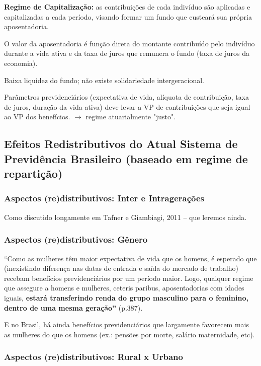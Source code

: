 \documentclass[a4paper,12pt]{article}[abntex2]
\begin{document}
\textbf{Regime de Capitalização:} as contribuições de cada indivíduo são aplicadas e capitalizadas a cada período, visando formar um fundo que custeará sua própria aposentadoria.

O valor da aposentadoria é função direta do montante contribuído pelo indivíduo durante a vida ativa e da taxa de juros que remunera o fundo (taxa de juros da economia). 

Baixa liquidez do fundo; não existe solidariedade intergeracional. 

Parâmetros previdenciários (expectativa de vida, alíquota de contribuição, taxa de juros, duração da vida ativa) deve levar a VP de contribuições que seja igual ao VP dos benefícios. \(\rightarrow\) regime atuarialmente "justo".

\subsection{\textbf{Efeitos Redistributivos do Atual Sistema de Previdência Brasileiro (baseado em regime de repartição)}}

\subsubsection{\textbf{Aspectos (re)distributivos: Inter e Intragerações}}

Como discutido longamente em Tafner e Giambiagi, 2011 – que leremos ainda.

\subsubsection{\textbf{Aspectos (re)distributivos: Gênero}}

“Como as mulheres têm maior expectativa de vida que os homens, é esperado que (inexistindo diferença nas datas de entrada e saída do mercado de trabalho) recebam benefícios previdenciários por um período maior. Logo, qualquer regime que assegure a homens e mulheres, ceteris paribus, aposentadorias com idades iguais, \textbf{estará transferindo renda do grupo masculino para o feminino, dentro de uma mesma geração”} (p.387).

E no Brasil, há ainda benefícios previdenciários que largamente favorecem mais as mulheres do que os homens (ex.: pensões por morte, salário maternidade, etc). 

\subsubsection{\textbf{Aspectos (re)distributivos: Rural x Urbano}}
\end{document}
